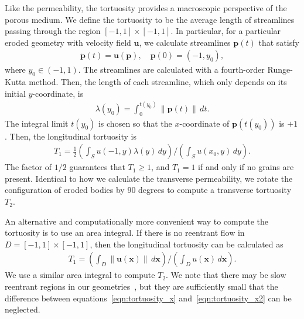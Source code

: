 \documentclass[3p]{elsarticle}
\newcommand{\nick}[1]{ {\color{red} #1} }
\newcommand{\pp}{{\mathbf{p}}}
\newcommand{\uu}{{\mathbf{u}}}
\newcommand{\xx}{{\mathbf{x}}}
\newcommand{\anis}{\mathcal{A}}
\newcommand{\anistort}{\mathcal{A_T}}
\begin{document}
Like the permeability, the tortuosity provides a macroscopic perspective
of the porous medium. We define the tortuosity to be the average length
of streamlines passing through the region $[-1,1] \times [-1,1]$. In
particular, for a particular eroded geometry with velocity field $\uu$,
we calculate streamlines $\pp(t)$ that satisfy
\begin{align}
  \dot{\pp}(t) = \uu(\pp), \quad \pp(0) = (-1,y_0),
\end{align}
where $y_0 \in (-1,1)$. The streamlines are calculated with a fourth-order Runge-Kutta method. Then, the length of each streamline, which only depends on its initial $y$-coordinate, is
\begin{align}
  \lambda(y_0) = \int_{0}^{t(y_0)} \|\pp(t)\| \,dt.
\end{align}
The integral limit $t(y_0)$ is chosen so that the $x$-coordinate of
$\pp(t(y_0))$ is $+1$. Then, the longitudinal tortuosity is
\begin{align}
  T_1 = \frac{1}{2}\left(\int_{S}u(-1,y)\lambda(y)\,dy \right)
  \Bigg/
  \left(\int_{S}u(x_0,y)\,dy \right).
  \label{eqn:tortuosity_x}
\end{align} 
The factor of $1/2$ guarantees that $T_1 \geq 1$, and $T_1 = 1$ if and only if no grains are present. Identical to how we calculate the transverse permeability, we rotate \nick{the configuration of} eroded bodies by 90 degrees to compute a transverse tortuosity $T_2$.


An alternative and computationally more convenient way to compute the tortuosity is to use an area integral. If there is no reentrant flow in $D = [-1,1] \times [-1,1]$, then the longitudinal tortuosity can be calculated as~\citep{dud-koz-mat2011}
\begin{align}
  T_1 = \left(\int_D \|\uu(\xx)\|\, d\xx \right) \Bigg/
      \left(\int_D u(\xx)\, d\xx \right).
  \label{eqn:tortuosity_x2}
\end{align}
We use a similar area integral to compute $T_2$. We note that there may be slow reentrant regions in our geometries~\cite{chiu2020viscous}, but they are sufficiently small that the difference between equations~\eqref{eqn:tortuosity_x} and~\eqref{eqn:tortuosity_x2} can be neglected.
\end{document}
